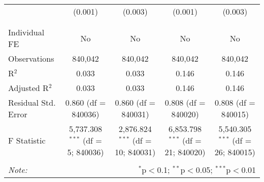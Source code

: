 \documentclass[
]{article}
\begin{document}
\begin{table}[!htbp]
{\begin{tabular}{@{\extracolsep{5pt}}lcccc}
  & (0.001) & (0.003) & (0.001) & (0.003) \\ 
  & & & & \\ 
\hline \\[-1.8ex] 
Individual FE & No & No & No & No \\ 
Observations & 840,042 & 840,042 & 840,042 & 840,042 \\ 
R$^{2}$ & 0.033 & 0.033 & 0.146 & 0.146 \\ 
Adjusted R$^{2}$ & 0.033 & 0.033 & 0.146 & 0.146 \\ 
Residual Std. Error & 0.860 (df = 840036) & 0.860 (df = 840031) & 0.808 (df = 840020) & 0.808 (df = 840015) \\ 
F Statistic & 5,737.308$^{***}$ (df = 5; 840036) & 2,876.824$^{***}$ (df = 10; 840031) & 6,853.798$^{***}$ (df = 21; 840020) & 5,540.305$^{***}$ (df = 26; 840015) \\ 
\hline 
\hline \\[-1.8ex] 
\textit{Note:}  & \multicolumn{4}{r}{$^{*}$p$<$0.1; $^{**}$p$<$0.05; $^{***}$p$<$0.01} \\ 
\end{tabular}
} 
\end{table} 
\newpage
\end{document}
